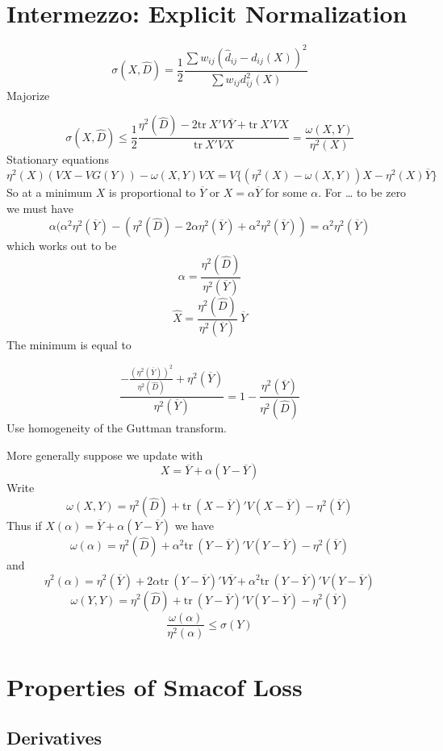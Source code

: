 \documentclass[
  12pt,
]{article}
\begin{document}
\section{Intermezzo: Explicit Normalization}\label{intermezzo-explicit-normalization}

\[
\sigma(X,\hat D)=\frac12\frac{\sum w_{ij}(\hat d_{ij}-d_{ij}(X))^2}{\sum w_{ij}d_{ij}^2(X)}
\]
Majorize

\[
\sigma(X,\hat D)\leq\frac12\frac{\eta^2(\hat D)-2\text{tr}\ X'V\overline{Y}+\text{tr}\ X'VX}{\text{tr}\ X'VX}=\frac{\omega(X,Y)}{\eta^2(X)}
\]
Stationary equations
\[
\eta^2(X)(VX-VG(Y))-\omega(X,Y)VX=V\{(\eta^2(X)-\omega(X,Y))X-\eta^2(X)\overline Y\}
\]
So at a minimum \(X\) is proportional to \(\overline{Y}\) or \(X=\alpha\overline{Y}\) for some \(\alpha\). For \ldots{} to be zero we must have
\[
\alpha(\alpha^2\eta^2(\overline Y)-(\eta^2(\hat D)-2\alpha\eta^2(\overline Y)+\alpha^2\eta^2(\overline Y))=\alpha^2\eta^2(\overline Y)
\]
which works out to be
\[
\alpha=\frac{\eta^2(\hat D)}{\eta^2(\overline Y)}
\]
\[
\hat X=\frac{\eta^2(\hat D)}{\eta^2(\overline Y)}\ \overline{Y}
\]
The minimum is equal to

\[
\frac{-\frac{(\eta^2(\overline Y))^2}{\eta^2(\hat D)}+\eta^2(\overline Y)}{\eta^2(\overline Y)}=1-\frac{\eta^2(\overline Y)}{\eta^2(\hat D)}
\]
Use homogeneity of the Guttman transform.

More generally suppose we update with
\[
X=\overline Y+\alpha(Y-\overline Y)
\]
Write
\[
\omega(X,Y)=\eta^2(\hat D)+\text{tr}\ (X-\overline Y)'V(X-\overline Y)-\eta^2(\overline Y)
\]
Thus if \(X(\alpha)=\overline Y+\alpha(Y-\overline Y)\) we have
\[
\omega(\alpha)=\eta^2(\hat D)+\alpha^2\text{tr}\ (Y-\overline Y)'V(Y-\overline Y)-\eta^2(\overline Y)
\]
and
\[
\eta^2(\alpha)=\eta^2(\overline Y)+2\alpha\text{tr}\ (Y-\overline Y)'V\overline Y+\alpha^2\text{tr}\ (Y-\overline Y)'V(Y-\overline Y)
\]
\[
\omega(Y,Y)=\eta^2(\hat D)+\text{tr}\ (Y-\overline Y)'V(Y-\overline Y)-\eta^2(\overline Y)
\]
\[
\frac{\omega(\alpha)}{\eta^2(\alpha)}\leq\sigma(Y)
\]

\section{Properties of Smacof Loss}\label{properties-of-smacof-loss}

\subsection{Derivatives}\label{derivatives}
\end{document}
